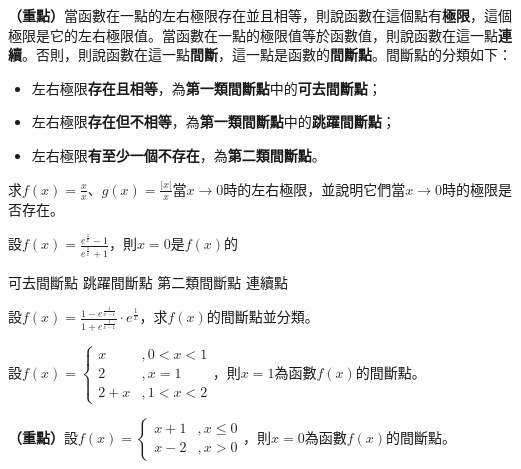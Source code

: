 \documentclass[12pt, addpoints]{exam}
\def \important{\textbf{（重點）}}
\begin{document}
\begin{questions}

\question
\important 當函數在一點的左右極限存在並且相等，則說函數在這個點有\textbf{極限}，這個極限是它的左右極限值。當函數在一點的極限值等於函數值，則說函數在這一點\textbf{連續}。否則，則說函數在這一點\textbf{間斷}，這一點是函數的\textbf{間斷點}。間斷點的分類如下：
\begin{itemize}
    \item
    左右極限\textbf{存在且相等}，為\textbf{第一類間斷點}中的\textbf{可去間斷點}；
    \item
    左右極限\textbf{存在但不相等}，為\textbf{第一類間斷點}中的\textbf{跳躍間斷點}；
    \item
    左右極限\textbf{有至少一個不存在}，為\textbf{第二類間斷點}。
\end{itemize}

\question[1]
求$\displaystyle f(x)=\frac{x}{x}$、$\displaystyle g(x)=\frac{|x|}{x}$當$x \to 0$時的左右極限，並說明它們當$x \to 0$時的極限是否存在。

\newpage %

\question[1]
設$\displaystyle f(x)=\frac{e^{\frac{1}{x}}-1}{e^{\frac{1}{x}}+1}$，則$x=0$是$f(x)$的
\begin{choices}
    \choice 可去間斷點
    \choice 跳躍間斷點
    \choice 第二類間斷點
    \choice 連續點
\end{choices}

\question[1]
設$\displaystyle f(x)=\frac{1-e^{\frac{1}{x-1}}}{1+e^{\frac{1}{x-1}}} \cdot e^{\frac{1}{x}}$，求$f(x)$的間斷點並分類。

\question[1]
設$f(x)=\begin{cases} 
    x &,0<x<1 \\ 
    2 &,x=1\\ 
    2+x &,1<x<2 
\end{cases}
$，則$x=1$為函數$f(x)$的\fillin[Black]間斷點。

\question[1]
\important 設$f(x)=\begin{cases} 
    x+1 &,x \leq 0 \\ 
    x-2 &,x>0
\end{cases}
$，則$x=0$為函數$f(x)$的\fillin[Black]間斷點。

\end{questions}
\end{document}
